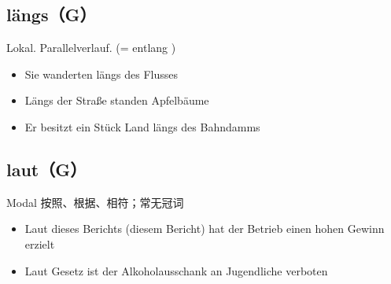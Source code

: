 \documentclass[UTF8]{report}
\begin{document}
\subsection{längs（G）}
Lokal. Parallelverlauf. (= entlang )
\begin{itemize}
    \item Sie wanderten längs des Flusses
    \item Längs der Straße standen Apfelbäume
    \item Er besitzt ein Stück Land längs des Bahndamms
\end{itemize}

\subsection{laut（G）}
Modal 按照、根据、相符；常无冠词
\begin{itemize}
    \item Laut dieses Berichts (diesem Bericht) hat der Betrieb einen hohen Gewinn erzielt
    \item Laut Gesetz ist der Alkoholausschank an Jugendliche verboten
\end{itemize}
\end{document}
